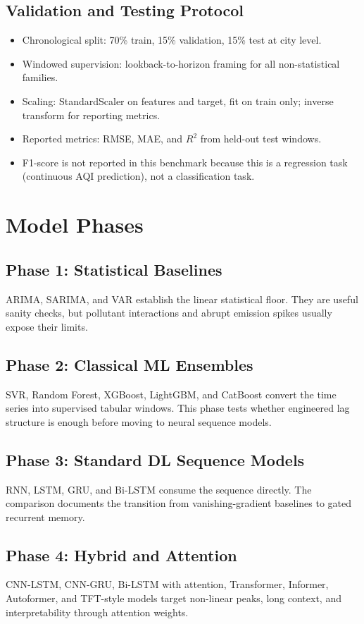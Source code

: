 \documentclass[11pt,a4paper,oneside]{book}
\begin{document}
\section{Validation and Testing Protocol}
\begin{itemize}
  \item Chronological split: 70\% train, 15\% validation, 15\% test at city level.
  \item Windowed supervision: lookback-to-horizon framing for all non-statistical families.
  \item Scaling: StandardScaler on features and target, fit on train only; inverse transform for reporting metrics.
  \item Reported metrics: RMSE, MAE, and $R^2$ from held-out test windows.
  \item F1-score is not reported in this benchmark because this is a regression task (continuous AQI prediction), not a classification task.
\end{itemize}

\chapter{Model Phases}
\section{Phase 1: Statistical Baselines}
ARIMA, SARIMA, and VAR establish the linear statistical floor. They are useful sanity checks, but pollutant interactions and abrupt emission spikes usually expose their limits.
\section{Phase 2: Classical ML Ensembles}
SVR, Random Forest, XGBoost, LightGBM, and CatBoost convert the time series into supervised tabular windows. This phase tests whether engineered lag structure is enough before moving to neural sequence models.
\section{Phase 3: Standard DL Sequence Models}
RNN, LSTM, GRU, and Bi-LSTM consume the sequence directly. The comparison documents the transition from vanishing-gradient baselines to gated recurrent memory.
\section{Phase 4: Hybrid and Attention}
CNN-LSTM, CNN-GRU, Bi-LSTM with attention, Transformer, Informer, Autoformer, and TFT-style models target non-linear peaks, long context, and interpretability through attention weights.
\end{document}
